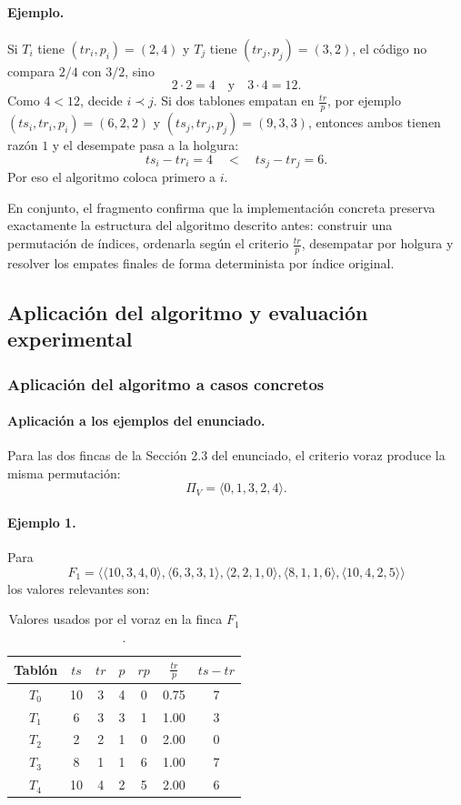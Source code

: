 \documentclass[12pt,a4paper]{article}
\begin{document}
\paragraph{Ejemplo.}
Si \(T_i\) tiene \((tr_i,p_i)=(2,4)\) y \(T_j\) tiene \((tr_j,p_j)=(3,2)\), el c\'odigo no compara \(2/4\) con \(3/2\), sino
\[
2\cdot 2 = 4
\quad\text{y}\quad
3\cdot 4 = 12.
\]
Como \(4<12\), decide \(i \prec j\). Si dos tablones empatan en \(\frac{tr}{p}\), por ejemplo \((ts_i,tr_i,p_i)=(6,2,2)\) y \((ts_j,tr_j,p_j)=(9,3,3)\), entonces ambos tienen raz\'on \(1\) y el desempate pasa a la holgura:
\[
ts_i-tr_i = 4
\quad<\quad
ts_j-tr_j = 6.
\]
Por eso el algoritmo coloca primero a \(i\).

En conjunto, el fragmento confirma que la implementaci\'on concreta preserva exactamente la estructura del algoritmo descrito antes: construir una permutaci\'on de \'indices, ordenarla seg\'un el criterio \(\frac{tr}{p}\), desempatar por holgura y resolver los empates finales de forma determinista por \'indice original.

\subsection{Aplicaci\'on del algoritmo y evaluaci\'on experimental}

\subsubsection{Aplicaci\'on del algoritmo a casos concretos}

\paragraph{Aplicaci\'on a los ejemplos del enunciado.}
Para las dos fincas de la Secci\'on 2.3 del enunciado, el criterio voraz produce la misma permutaci\'on:
\[
\Pi_V = \langle 0,1,3,2,4 \rangle.
\]

\paragraph{Ejemplo 1.}
Para
\[
F_1=\langle\langle 10,3,4,0\rangle,\langle 6,3,3,1\rangle,\langle 2,2,1,0\rangle,\langle 8,1,1,6\rangle,\langle 10,4,2,5\rangle\rangle
\]
los valores relevantes son:

\begin{table}[ht]
  \centering
  \small
  \begin{tabular}{ccccccc}
    \toprule
    Tabl\'on & \(ts\) & \(tr\) & \(p\) & \(rp\) & \(\frac{tr}{p}\) & \(ts-tr\) \\
    \midrule
    \(T_0\) & 10 & 3 & 4 & 0 & 0.75 & 7 \\
    \(T_1\) & 6 & 3 & 3 & 1 & 1.00 & 3 \\
    \(T_2\) & 2 & 2 & 1 & 0 & 2.00 & 0 \\
    \(T_3\) & 8 & 1 & 1 & 6 & 1.00 & 7 \\
    \(T_4\) & 10 & 4 & 2 & 5 & 2.00 & 6 \\
    \bottomrule
  \end{tabular}
  \caption{Valores usados por el voraz en la finca \(F_1\).}
\end{table}
\end{document}
